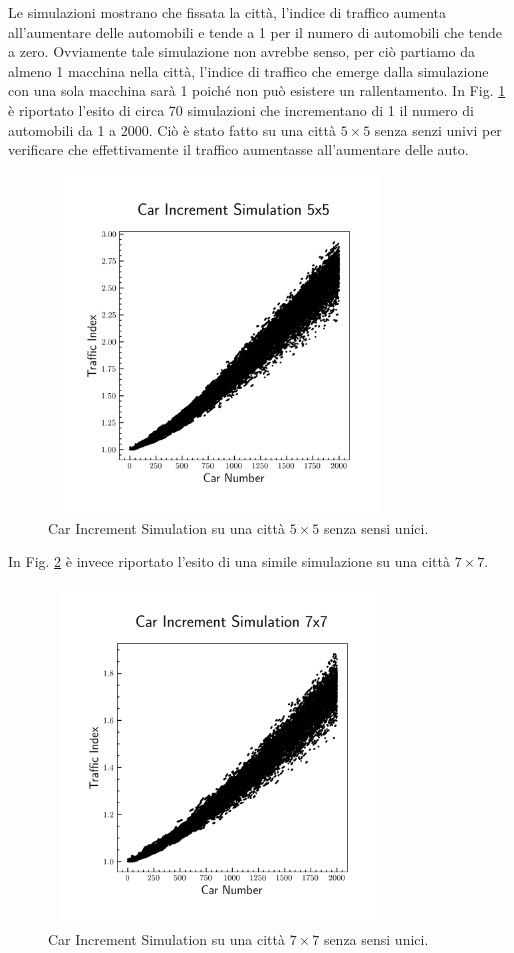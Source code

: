 \documentclass[main.tex]{subfiles}
\begin{document}
    Le simulazioni mostrano che fissata la città, l'indice di traffico aumenta all'aumentare delle automobili
    e tende a 1 per il numero di automobili che tende a zero. Ovviamente tale simulazione non avrebbe senso, per ciò 
    partiamo da almeno 1 macchina nella città, l'indice di traffico che emerge dalla simulazione con una sola macchina
    sarà 1 poiché non può esistere un rallentamento.
    In Fig. \ref{fig:1} è riportato l'esito di circa 70 simulazioni che incrementano di 1 il numero di automobili da 1 a 2000.
    Ciò è stato fatto su una città $5 \times 5$ senza senzi univi per verificare che effettivamente il traffico aumentasse
    all'aumentare delle auto.
    \begin{figure}[H]
        \centering
        \includegraphics[width=9cm, height=9cm]{car_increment5x5.png}
        \caption{Car Increment Simulation su una città $5 \times 5$ senza sensi unici.}
        \label{fig:1}
    \end{figure}

    \newpage

    In Fig. \ref{fig:2} è invece riportato l'esito di una simile simulazione su una città $7 \times 7$.
    \begin{figure}[H]
        \centering
        \includegraphics[width=9cm, height=9cm]{car_increment7x7.png}
        \caption{Car Increment Simulation su una città $7 \times 7$ senza sensi unici.}
        \label{fig:2}
    \end{figure}
\end{document}
